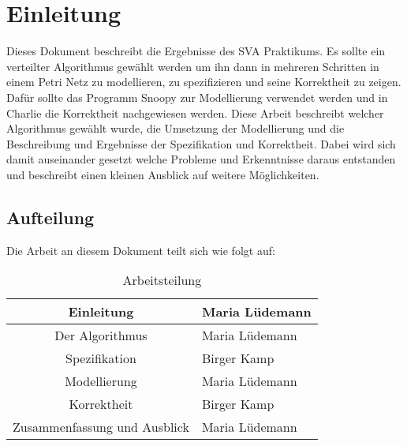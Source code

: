 \newpage
\section{Einleitung} 
Dieses Dokument beschreibt die Ergebnisse des SVA Praktikums. Es sollte ein verteilter Algorithmus gewählt werden um ihn dann in mehreren Schritten in einem Petri Netz zu modellieren, zu spezifizieren und seine Korrektheit zu zeigen. Dafür sollte das Programm Snoopy zur Modellierung verwendet werden und in Charlie die Korrektheit nachgewiesen werden. Diese Arbeit beschreibt welcher Algorithmus gewählt wurde, die Umsetzung der Modellierung und die Beschreibung und Ergebnisse der Spezifikation und Korrektheit.
Dabei wird sich damit auseinander gesetzt welche Probleme und Erkenntnisse daraus entstanden und beschreibt einen kleinen Ausblick auf weitere Möglichkeiten.

\subsection{Aufteilung}
Die Arbeit an diesem Dokument teilt sich wie folgt auf:

\begin{table}[H]
\centering
 \begin{tabular}{|c|l|}
 \hline
 	Einleitung & Maria Lüdemann\\
 \hline
	Der Algorithmus & Maria Lüdemann\\
 \hline	
	Spezifikation & Birger Kamp\\
 \hline	
 	Modellierung & Maria Lüdemann\\
 \hline
 	Korrektheit & Birger Kamp\\
 \hline	
 	Zusammenfassung und Ausblick & Maria Lüdemann\\
 \hline		 
 
 \end{tabular}
\caption{Arbeitsteilung}
\end{table}